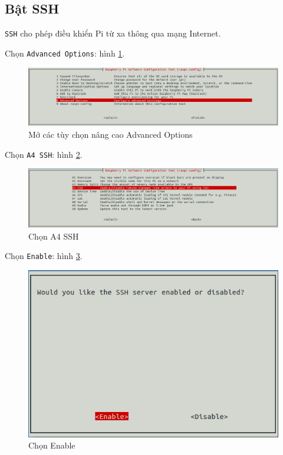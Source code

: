 \subsection{Bật SSH}
\verb|SSH| cho phép điều khiển Pi từ xa thông qua mạng Internet.
\begin{list}{--}{}
\item Chọn \verb|Advanced Options|: hình \ref{Fig:Advanced Options}.
\begin{figure}[!h]
\begin{center}
\includegraphics[scale=.35]{setup-os/images/ssh-setup}
\end{center}
\caption{Mở các tùy chọn nâng cao \textsf{Advanced Options}}\label{Fig:Advanced Options}
\end{figure}
\item Chọn \verb|A4 SSH|: hình \ref{Fig:A4 SSH}.
\begin{figure}[!h]
\begin{center}
\includegraphics[scale=.35]{setup-os/images/a4-ssh}
\end{center}
\caption{Chọn  \textsf{A4 SSH}}\label{Fig:A4 SSH}
\end{figure}
\item Chọn \verb|Enable|: hình \ref{Fig:Enable}.
\begin{figure}[!h]
\begin{center}
\includegraphics[scale=.35]{setup-os/images/a4-ssh-2}
\end{center}
\caption{Chọn \textsf{Enable}}\label{Fig:Enable}
\end{figure}
\end{list}